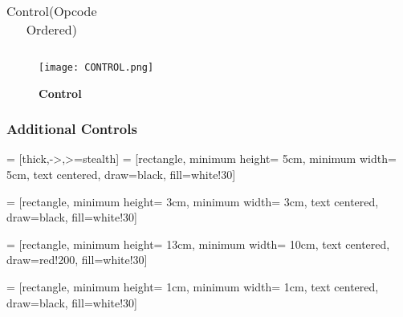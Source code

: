 \documentclass[12pt]{article}
\begin{document}
\begin{table}[H]
\begin{adjustbox}{width=\textwidth}
\begin{tabular}{|c|c|c|c|c|c|c|c|c|c|c|}
        \end{tabular}
    \end{adjustbox}
    \caption{Control(Opcode Ordered)}
    \label{tab:t5}
\end{table}

    \begin{figure}[H]
        \centering
        \texttt{[image: CONTROL.png]}
        \caption{\textbf{Control}}
        \label{fig:3}
    \end{figure}

\subsubsection{Additional Controls}

 = [thick,->,>=stealth]
 = [rectangle, 
minimum height= 5cm,
minimum width= 5cm, 
text centered, 
draw=black, 
fill=white!30]

 = [rectangle, 
minimum height= 3cm,
minimum width= 3cm, 
text centered, 
draw=black, 
fill=white!30]

 = [rectangle, 
minimum height= 13cm,
minimum width= 10cm, 
text centered, 
draw=red!200, 
fill=white!30]

 = [rectangle, 
minimum height= 1cm,
minimum width= 1cm, 
text centered, 
draw=black, 
fill=white!30]
\end{document}
